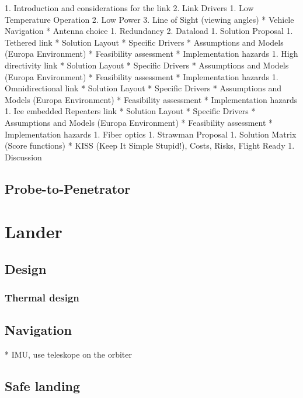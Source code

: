 \documentclass{book}
\begin{document}
1. Introduction and considerations for the link
2. Link Drivers
   1. Low Temperature Operation
   2. Low Power
   3. Line of Sight (viewing angles)
      * Vehicle Navigation
      * Antenna choice
   1. Redundancy
   2. Dataload
1. Solution Proposal
   1. Tethered link
      * Solution Layout
         * Specific Drivers
      * Assumptions and Models (Europa Environment)
      * Feasibility assessment
      * Implementation hazards
   1. High directivity link
      * Solution Layout
         * Specific Drivers
      * Assumptions and Models (Europa Environment)
      * Feasibility assessment
      * Implementation hazards
   1. Omnidirectional link
      * Solution Layout
         * Specific Drivers
      * Assumptions and Models (Europa Environment)
      * Feasibility assessment
      * Implementation hazards
   1. Ice embedded Repeaters link
      * Solution Layout
         * Specific Drivers
      * Assumptions and Models (Europa Environment)
      * Feasibility assessment
      * Implementation hazards
    1. Fiber optics
1. Strawman Proposal
   1. Solution Matrix (Score functions)
      * KISS (Keep It Simple Stupid!), Costs, Risks, Flight Ready
   1. Discussion

\subsection{Probe-to-Penetrator}

\section{Lander}

\subsection{Design}

\subsubsection{Thermal design}

\subsection{Navigation}

* IMU, use teleskope on the orbiter

\subsection{Safe landing}
\end{document}
